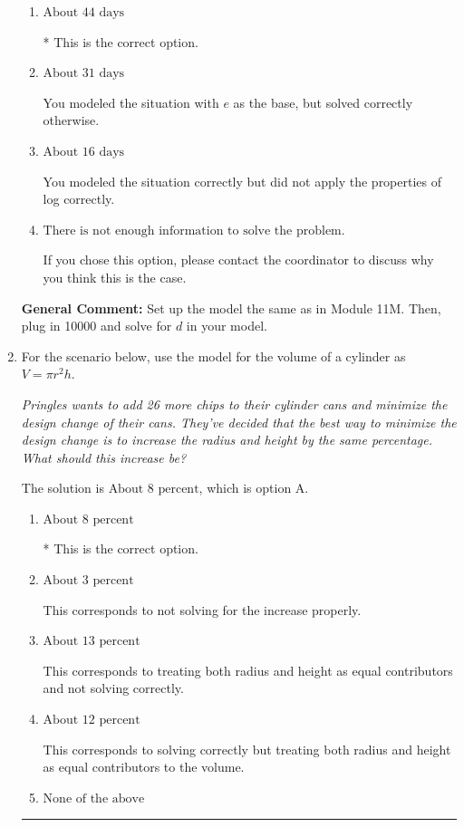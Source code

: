 \documentclass{extbook}[14pt]
\newcommand{\litem}[1]{\item #1

\rule{\textwidth}{0.4pt}}
\begin{document}
\begin{enumerate}
{\begin{enumerate}[label=\Alph*.]
You modeled the situation with $e$ as the base and did not apply the properties of log correctly.
\item \( \text{About } 44 \text{ days} \)

* This is the correct option.
\item \( \text{About } 31 \text{ days} \)

You modeled the situation with $e$ as the base, but solved correctly otherwise.
\item \( \text{About } 16 \text{ days} \)

You modeled the situation correctly but did not apply the properties of log correctly.
\item \( \text{There is not enough information to solve the problem.} \)

If you chose this option, please contact the coordinator to discuss why you think this is the case.
\end{enumerate}

\textbf{General Comment:} Set up the model the same as in Module 11M. Then, plug in 10000 and solve for $d$ in your model.
}
\litem{
For the scenario below, use the model for the volume of a cylinder as $V = \pi r^2 h$.

\begin{center}
    \textit{ Pringles wants to add 26 \text{percent} more chips to their cylinder cans and minimize the design change of their cans. They've decided that the best way to minimize the design change is to increase the radius and height by the same percentage. What should this increase be? }
\end{center}
The solution is \( \text{About } 8 \text{ percent} \), which is option A.\begin{enumerate}[label=\Alph*.]
\item \( \text{About } 8 \text{ percent} \)

* This is the correct option.
\item \( \text{About } 3 \text{ percent} \)

This corresponds to not solving for the increase properly.
\item \( \text{About } 13 \text{ percent} \)

This corresponds to treating both radius and height as equal contributors and not solving correctly.
\item \( \text{About } 12 \text{ percent} \)

This corresponds to solving correctly but treating both radius and height as equal contributors to the volume.
\item \( \text{None of the above} \)


\end{enumerate}}
\end{enumerate}
\end{document}

